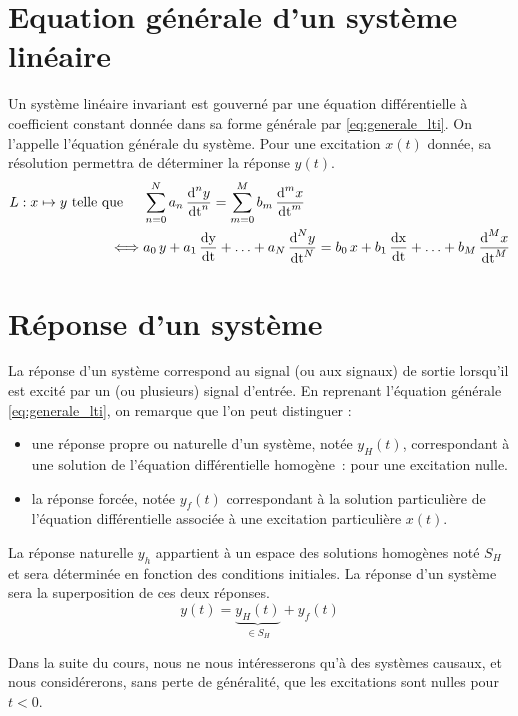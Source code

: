 	\section{Equation générale d'un système linéaire}
        Un système linéaire invariant est gouverné par une équation
        différentielle à coefficient constant donnée dans sa forme
        générale par \ref{eq:generale_lti}. On l'appelle l'équation
        générale du système. Pour une excitation $x(t)$ donnée, sa
        résolution permettra de déterminer la réponse $y(t)$.	
	\begin{eqnarray}\label{eq:generale_lti}
          L : x \mapsto y \text{ telle que }\;\;\;\; &\sum_{n=0}^N{a_{n}\,\frac{\mathrm{d{}}^{n}y}{{\mathrm{d{t}}}^{n}}} = \sum_{m=0}^M b_{m}\, \frac{\mathrm{d{}}^{m}x}{{\mathrm{d{t}}}^{m}}\\\nonumber
       \iff & a_0\,y + a_1\,\frac{\mathrm{d{y}}}{\mathrm{d{t}}} +\ldots + a_{N}\,\frac{\mathrm{d{}}^{N}y}{{\mathrm{d{t}}}^{N}} = b_0\,x + b_1\,\frac{\mathrm{d{x}}}{\mathrm{d{t}}} +\ldots + b_{M}\,\frac{\mathrm{d{}}^{M}x}{{\mathrm{d{t}}}^{M}} 
        \end{eqnarray}
	
	
	\section{Réponse d'un système}
	La réponse d'un système correspond au signal (ou aux signaux)
        de sortie lorsqu'il est excité par un (ou plusieurs) signal
        d'entrée. En reprenant l'équation générale
        \ref{eq:generale_lti}, on remarque que l'on peut
        distinguer :
	\begin{itemize}
        \item une réponse propre ou naturelle d'un système, notée
          $y_{H}(t)$, correspondant à une solution de l'équation
          différentielle homogène~: \cad{} pour une excitation nulle.
        \item la réponse forcée, notée $y_{f}(t)$ correspondant à la
          solution particulière de l'équation différentielle associée
          à une excitation particulière $x(t)$.
	\end{itemize}
	
	La réponse naturelle $y_h$ appartient à un espace des
        solutions homogènes noté $S_H$ et sera déterminée en fonction
        des conditions initiales. La réponse d'un système sera la
        superposition de ces deux réponses.
	\begin{equation}
          y(t) = \underbrace{y_{H}(t)}_{\in S_H} + y_{f}(t)          
	\end{equation}
	
	Dans la suite du cours, nous ne nous intéresserons qu'à des
        systèmes causaux, et nous considérerons, sans perte de
        généralité, que les excitations sont nulles pour $t < 0$.
	

